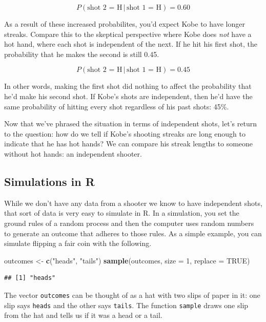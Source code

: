 \documentclass[]{article}
\newenvironment{Shaded}{\begin{snugshade}}{\end{snugshade}}
\newcommand{\KeywordTok}[1]{\textcolor[rgb]{0.13,0.29,0.53}{\textbf{{#1}}}}
\newcommand{\DataTypeTok}[1]{\textcolor[rgb]{0.13,0.29,0.53}{{#1}}}
\newcommand{\DecValTok}[1]{\textcolor[rgb]{0.00,0.00,0.81}{{#1}}}
\newcommand{\StringTok}[1]{\textcolor[rgb]{0.31,0.60,0.02}{{#1}}}
\newcommand{\OtherTok}[1]{\textcolor[rgb]{0.56,0.35,0.01}{{#1}}}
\newcommand{\NormalTok}[1]{{#1}}
\begin{document}
\[ P(\textrm{shot 2 = H} \, | \, \textrm{shot 1 = H}) = 0.60 \]

As a result of these increased probabilites, you'd expect Kobe to have
longer streaks. Compare this to the skeptical perspective where Kobe
does \emph{not} have a hot hand, where each shot is independent of the
next. If he hit his first shot, the probability that he makes the second
is still 0.45.

\[ P(\textrm{shot 2 = H} \, | \, \textrm{shot 1 = H}) = 0.45 \]

In other words, making the first shot did nothing to affect the
probability that he'd make his second shot. If Kobe's shots are
independent, then he'd have the same probability of hitting every shot
regardless of his past shots: 45\%.

Now that we've phrased the situation in terms of independent shots,
let's return to the question: how do we tell if Kobe's shooting streaks
are long enough to indicate that he has hot hands? We can compare his
streak lengths to someone without hot hands: an independent shooter.

\subsection{Simulations in R}\label{simulations-in-r}

While we don't have any data from a shooter we know to have independent
shots, that sort of data is very easy to simulate in R. In a simulation,
you set the ground rules of a random process and then the computer uses
random numbers to generate an outcome that adheres to those rules. As a
simple example, you can simulate flipping a fair coin with the
following.

\begin{Shaded}
\begin{Highlighting}[]
\NormalTok{outcomes <-}\StringTok{ }\KeywordTok{c}\NormalTok{(}\StringTok{"heads"}\NormalTok{, }\StringTok{"tails"}\NormalTok{)}
\KeywordTok{sample}\NormalTok{(outcomes, }\DataTypeTok{size =} \DecValTok{1}\NormalTok{, }\DataTypeTok{replace =} \OtherTok{TRUE}\NormalTok{)}
\end{Highlighting}
\end{Shaded}

\begin{verbatim}
## [1] "heads"
\end{verbatim}

The vector \texttt{outcomes} can be thought of as a hat with two slips
of paper in it: one slip says \texttt{heads} and the other says
\texttt{tails}. The function \texttt{sample} draws one slip from the hat
and tells us if it was a head or a tail.
\end{document}
